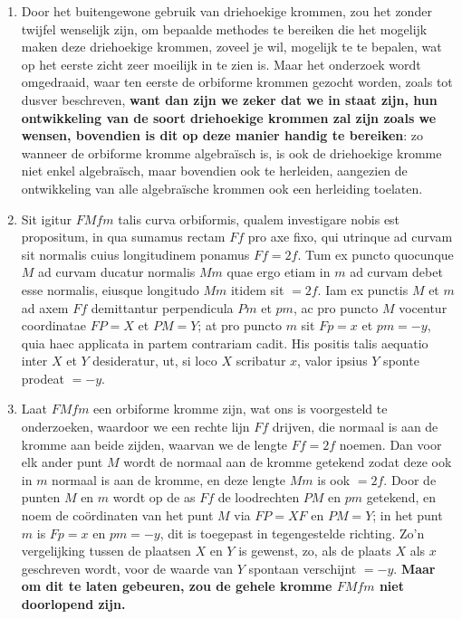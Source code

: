 \documentclass[10pt,a4paper]{article}
\newcommand{\switchenum}{\setcounter{enumi}{\arabic{enumi}-1}\switchcolumn}
\begin{document}
\begin{paracol}{2}
\begin{enumerate}[topsep=1px]
		\switchenum
		\item Door het buitengewone gebruik van driehoekige krommen, zou het zonder twijfel wenselijk zijn, om bepaalde methodes te bereiken die het mogelijk maken deze driehoekige krommen, zoveel je wil, mogelijk te te bepalen, wat op het eerste zicht zeer moeilijk in te zien is. Maar het onderzoek wordt omgedraaid, waar ten eerste de orbiforme krommen gezocht worden,  zoals tot dusver beschreven, \textbf{want dan zijn we zeker dat we in staat zijn, hun ontwikkeling van de soort driehoekige krommen zal zijn zoals we wensen, bovendien is dit op deze manier handig te bereiken}: zo wanneer de orbiforme kromme algebraïsch is, is ook de driehoekige kromme niet enkel algebraïsch, maar bovendien ook te herleiden, aangezien de ontwikkeling van alle algebraïsche krommen ook een herleiding toelaten.
		
		\switchcolumn*
		
		\item Sit igitur $FMfm$ talis curva orbiformis, qualem investigare nobis est propositum, in qua sumamus rectam $Ff$ pro axe fixo, qui utrinque ad curvam sit normalis cuius longitudinem ponamus $Ff=2f$. Tum ex puncto quocunque $M$ ad curvam ducatur normalis $Mm$ quae ergo etiam in $m$ ad curvam debet esse normalis, eiusque longitudo $Mm$ itidem sit $=2f$. Iam ex punctis $M$ et $m$ ad axem $Ff$ demittantur perpendicula $Pm$ et $pm$, ac pro puncto $M$ vocentur coordinatae $FP=X$ et $PM=Y$; at pro puncto $m$ sit $Fp=x$ et $pm = -y$, quia haec applicata in partem contrariam cadit. His positis talis aequatio inter $X$ et $Y$ desideratur, ut, si loco $X$ scribatur $x$, valor ipsius $Y$ sponte prodeat $=-y$. 
		
		\switchenum
		\item Laat $FMfm$ een orbiforme kromme zijn, wat ons is voorgesteld te onderzoeken, waardoor we een rechte lijn $Ff$ drijven, die normaal is aan de kromme aan beide zijden, waarvan we de lengte $Ff=2f$ noemen. Dan voor elk ander punt $M$ wordt de normaal aan de kromme getekend zodat deze ook in $m$ normaal is aan de kromme, en deze lengte $Mm$ is ook $=2f$. Door de punten $M$ en $m$ wordt op de as $Ff$ de loodrechten $PM$ en $pm$ getekend, en noem de coördinaten van het punt $M$ via $FP=XF$ en $PM=Y$; in het punt $m$ is $Fp=x$ en $pm=-y$, dit is toegepast in tegengestelde richting. Zo'n vergelijking tussen de plaatsen $X$ en $Y$ is gewenst, zo, als de plaats $X$ als $x$ geschreven wordt, voor de waarde van $Y$ spontaan verschijnt $=-y$. \textbf{ Maar om dit te laten gebeuren, zou de gehele kromme $FMfm$ niet doorlopend zijn.} 
		

\end{enumerate}
\end{paracol}
\end{document}
